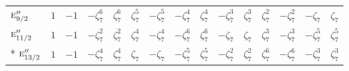 \documentclass[10pt,a4paper]{article}
\numberwithin{equation}{section}
\newcommand{\irr}[1]{\text{\normalfont\scshape #1}}
\newcommand{\rootunity}[1]{\zeta_{#1}}
\begin{document}
{\begin{longtable}{@{}lcccccccccccccc@{}}
$\irr{e}_{9/2}''$ & $1$ & $-1$ & $-\rootunity{7}^{6}$ & $\rootunity{7}^{6}$ & $\rootunity{7}^{5}$ & $-\rootunity{7}^{5}$ & $-\rootunity{7}^{4}$ & $\rootunity{7}^{4}$ & $-\rootunity{7}^{3}$ & $\rootunity{7}^{3}$ & $\rootunity{7}^{2}$ & $-\rootunity{7}^{2}$ & $-\rootunity{7}$ & $\rootunity{7}$\\
$\irr{e}_{11/2}''$ & $1$ & $-1$ & $-\rootunity{7}^{2}$ & $\rootunity{7}^{2}$ & $\rootunity{7}^{4}$ & $-\rootunity{7}^{4}$ & $-\rootunity{7}^{6}$ & $\rootunity{7}^{6}$ & $-\rootunity{7}$ & $\rootunity{7}$ & $\rootunity{7}^{3}$ & $-\rootunity{7}^{3}$ & $-\rootunity{7}^{5}$ & $\rootunity{7}^{5}$\\*
$\irr{e}_{13/2}''$ & $1$ & $-1$ & $-\rootunity{7}^{4}$ & $\rootunity{7}^{4}$ & $\rootunity{7}$ & $-\rootunity{7}$ & $-\rootunity{7}^{5}$ & $\rootunity{7}^{5}$ & $-\rootunity{7}^{2}$ & $\rootunity{7}^{2}$ & $\rootunity{7}^{6}$ & $-\rootunity{7}^{6}$ & $-\rootunity{7}^{3}$ & $\rootunity{7}^{3}$\\
\bottomrule\end{longtable}}
\end{document}
